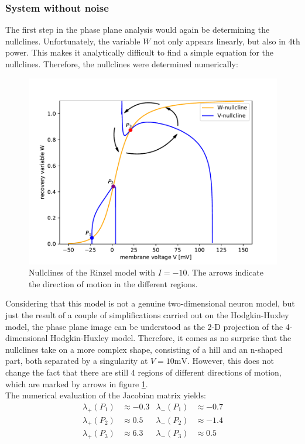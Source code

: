 \documentclass[12pt,a4paper]{article}
\begin{document}
\subsubsection{System without noise}
The first step in the phase plane analysis would again be determining the nullclines. Unfortunately, the variable $W$ not only appears linearly, but also in 4th power. This makes it analytically difficult to find a simple equation for the nullclines. Therefore, the nullclines were determined numerically:
\begin{figure}[H]
	\centering
	\includegraphics[scale=0.5]{rinzelclinesarrowwp.pdf}\caption{Nullclines of the Rinzel model with $I=-10$. The arrows indicate the direction of motion in the different regions.}
	\label{rinzelnc}
\end{figure}
Considering that this model is not a genuine two-dimensional neuron model, but just the result of a couple of simplifications carried out on the Hodgkin-Huxley model, the phase plane image can be understood as the 2-D projection of the 4-dimensional Hodgkin-Huxley model. Therefore, it comes as no surprise that the nullclines take on a more complex shape, consisting of a hill and an n-shaped part, both separated by a singularity at $V=10\text{mV}$. However, this does not change the fact that there are still 4 regions of different directions of motion, which are marked by arrows in figure \ref{rinzelnc}. \\
The numerical evaluation of the Jacobian matrix yields:
\begin{align*}
\lambda_+(P_1)&\approx-0.3 & \lambda_-(P_1)&\approx-0.7\\
\lambda_+(P_2)&\approx 0.5& \lambda_-(P_2)&\approx -1.4\\
\lambda_+(P_3)&\approx 6.3& \lambda_-(P_3)&\approx 0.5
\end{align*}
\end{document}
